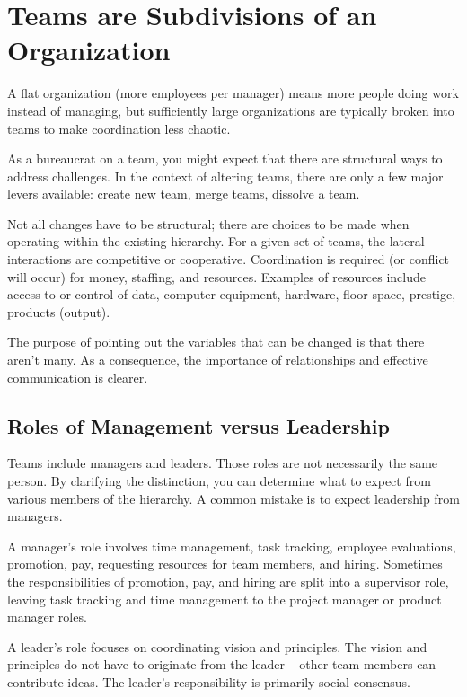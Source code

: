 

\section{Teams are Subdivisions of an Organization}

A flat organization (more employees per manager) means more people doing work instead of managing, but sufficiently large organizations are typically broken into teams to make coordination less chaotic. 


As a bureaucrat on a team, you might expect that there are structural ways to address challenges. 
In the context of altering teams, there are only a few major levers available: create new team, merge teams, dissolve a team. 

Not all changes have to be structural; there are choices to be made when operating within the existing hierarchy.
For a given set of teams, the lateral interactions are competitive or cooperative. Coordination is required (or conflict will occur) for money, staffing, and resources. Examples of resources include access to or control of data, computer equipment, hardware, floor space, prestige, products (output).

The purpose of pointing out the variables that can be changed is that there aren't many. As a consequence, the importance of  relationships and effective communication is clearer. 

\subsection*{Roles of Management versus Leadership}

Teams include managers and leaders. Those roles are not necessarily the same person. By clarifying the distinction, you can determine what to expect from various members of the hierarchy. A common mistake is to expect leadership from managers. 

A manager's role involves time management, task tracking, employee evaluations, promotion, pay, requesting resources for team members, and hiring. Sometimes the responsibilities of promotion, pay, and hiring are split into a supervisor role, leaving task tracking and time management to the project manager or product manager roles.

A leader's role focuses on coordinating vision and principles. The vision and principles do not have to originate from the leader -- other team members can contribute ideas. The leader's responsibility is primarily social consensus. 
